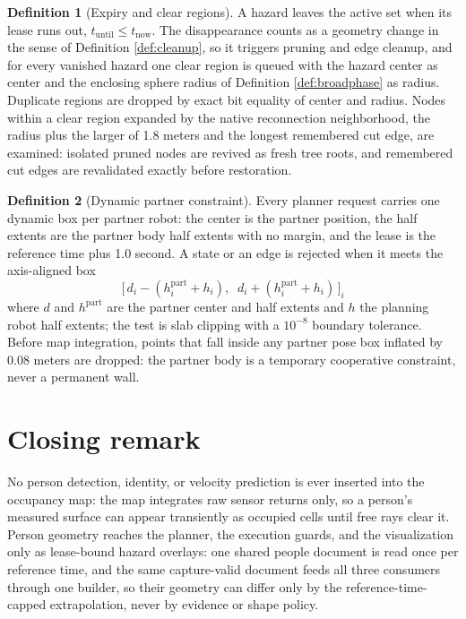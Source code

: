 \documentclass[10pt,a4paper]{article}
\theoremstyle{plain}
\theoremstyle{definition}
\newtheorem{definition}{Definition}[section]
\theoremstyle{remark}
\begin{document}
\begin{definition}[Expiry and clear regions]\label{def:expiry}
A hazard leaves the active set when its lease runs out, $t_{\mathrm{until}} \le t_{\mathrm{now}}$. The disappearance counts as a geometry change in the sense of Definition \ref{def:cleanup}, so it triggers pruning and edge cleanup, and for every vanished hazard one clear region is queued with the hazard center as center and the enclosing sphere radius of Definition \ref{def:broadphase} as radius. Duplicate regions are dropped by exact bit equality of center and radius. Nodes within a clear region expanded by the native reconnection neighborhood, the radius plus the larger of 1.8 meters and the longest remembered cut edge, are examined: isolated pruned nodes are revived as fresh tree roots, and remembered cut edges are revalidated exactly before restoration.
\end{definition}

\begin{definition}[Dynamic partner constraint]\label{def:partner}
Every planner request carries one dynamic box per partner robot: the center is the partner position, the half extents are the partner body half extents with no margin, and the lease is the reference time plus 1.0 second. A state or an edge is rejected when it meets the axis-aligned box
\begin{equation}
\bigl[\,d_i - (h^{\mathrm{part}}_i + h_i),\;\; d_i + (h^{\mathrm{part}}_i + h_i)\,\bigr]_i
\end{equation}
where $d$ and $h^{\mathrm{part}}$ are the partner center and half extents and $h$ the planning robot half extents; the test is slab clipping with a $10^{-8}$ boundary tolerance. Before map integration, points that fall inside any partner pose box inflated by 0.08 meters are dropped: the partner body is a temporary cooperative constraint, never a permanent wall.
\end{definition}

\section{Closing remark}

No person detection, identity, or velocity prediction is ever inserted into the occupancy map: the map integrates raw sensor returns only, so a person's measured surface can appear transiently as occupied cells until free rays clear it. Person geometry reaches the planner, the execution guards, and the visualization only as lease-bound hazard overlays: one shared people document is read once per reference time, and the same capture-valid document feeds all three consumers through one builder, so their geometry can differ only by the reference-time-capped extrapolation, never by evidence or shape policy.
\end{document}
